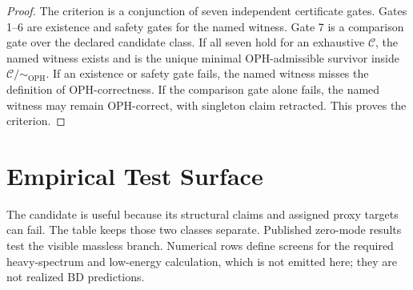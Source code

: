\documentclass[11pt]{article}
\theoremstyle{remark}
\theoremstyle{plain}
\newcommand{\OPH}{\mathrm{OPH}}
\newcommand{\Teq}{\sim_{\OPH}}
\begin{document}
\begin{proof}
The criterion is a conjunction of seven independent certificate gates. Gates 1--6 are
existence and safety gates for the named witness. Gate 7 is a comparison gate over the declared
candidate class. If all seven hold for an exhaustive \(\mathcal C\), the named witness exists and is
the unique minimal OPH-admissible survivor inside \(\mathcal C/\Teq\). If an existence or safety
gate fails, the named witness misses the definition of OPH-correctness. If the comparison gate
alone fails, the named witness may remain OPH-correct, with singleton claim retracted. This proves
the criterion.
\end{proof}

\section{Empirical Test Surface}

The candidate is useful because its structural claims and assigned proxy targets can fail. The
table keeps those two classes separate. Published zero-mode results test the visible massless
branch. Numerical rows define screens for the required heavy-spectrum and low-energy calculation,
which is not emitted here; they are not realized BD predictions.
\end{document}
